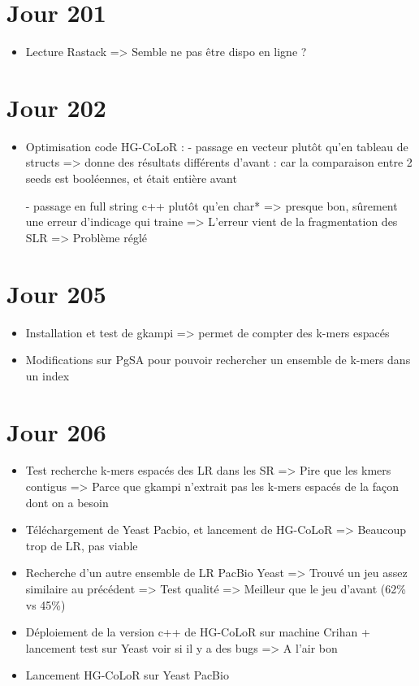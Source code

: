 \documentclass[12pt]{report}
\begin{document}
\section{Jour 201}

\begin{itemize}
	\item Lecture Rastack => Semble ne pas être dispo en ligne ?
\end{itemize}

\section{Jour 202}

\begin{itemize}
	\item Optimisation code HG-CoLoR :
			- passage en vecteur plutôt qu'en tableau de structs 
			  => donne des résultats différents d'avant : car la comparaison entre 2 seeds est booléennes, et était entière avant
			  
			- passage en full string c++ plutôt qu'en char*
			  => presque bon, sûrement une erreur d'indicage qui traine
			  => L'erreur vient de la fragmentation des SLR => Problème réglé
\end{itemize}

\section{Jour 205}

\begin{itemize}
	\item Installation et test de gkampi => permet de compter des k-mers espacés
	
	\item Modifications sur PgSA pour pouvoir rechercher un ensemble de k-mers dans un index
\end{itemize}

\section{Jour 206}

\begin{itemize}
	\item Test recherche k-mers espacés des LR dans les SR => Pire que les kmers contigus
			=> Parce que gkampi n'extrait pas les k-mers espacés de la façon dont on a besoin
	
	\item Téléchargement de Yeast Pacbio, et lancement de HG-CoLoR => Beaucoup trop de LR, pas viable
	
	\item Recherche d'un autre ensemble de LR PacBio Yeast => Trouvé un jeu assez similaire au précédent
			=> Test qualité => Meilleur que le jeu d'avant (62\% vs 45\%)
	
	\item Déploiement de la version c++ de HG-CoLoR sur machine Crihan + lancement test sur Yeast voir si il y a des bugs => A l'air bon
	
	\item Lancement HG-CoLoR sur Yeast PacBio
\end{itemize}
\end{document}
